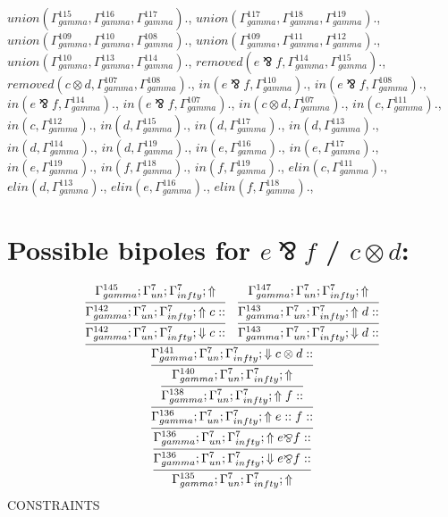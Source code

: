 \documentclass[a4paper, 11pt]{article}
\begin{document}
$union(\Gamma_{gamma}^{115}, \Gamma_{gamma}^{116}, \Gamma_{gamma}^{117}).$, $union(\Gamma_{gamma}^{117}, \Gamma_{gamma}^{118}, \Gamma_{gamma}^{119}).$, $union(\Gamma_{gamma}^{109}, \Gamma_{gamma}^{110}, \Gamma_{gamma}^{108}).$, $union(\Gamma_{gamma}^{109}, \Gamma_{gamma}^{111}, \Gamma_{gamma}^{112}).$, $union(\Gamma_{gamma}^{110}, \Gamma_{gamma}^{113}, \Gamma_{gamma}^{114}).$, $removed(e \bindnasrepma f, \Gamma_{gamma}^{114}, \Gamma_{gamma}^{115}).$, $removed(c \otimes d, \Gamma_{gamma}^{107}, \Gamma_{gamma}^{108}).$, $in(e \bindnasrepma f, \Gamma_{gamma}^{110}).$, $in(e \bindnasrepma f, \Gamma_{gamma}^{108}).$, $in(e \bindnasrepma f, \Gamma_{gamma}^{114}).$, $in(e \bindnasrepma f, \Gamma_{gamma}^{107}).$, $in(c \otimes d, \Gamma_{gamma}^{107}).$, $in(c, \Gamma_{gamma}^{111}).$, $in(c, \Gamma_{gamma}^{112}).$, $in(d, \Gamma_{gamma}^{115}).$, $in(d, \Gamma_{gamma}^{117}).$, $in(d, \Gamma_{gamma}^{113}).$, $in(d, \Gamma_{gamma}^{114}).$, $in(d, \Gamma_{gamma}^{119}).$, $in(e, \Gamma_{gamma}^{116}).$, $in(e, \Gamma_{gamma}^{117}).$, $in(e, \Gamma_{gamma}^{119}).$, $in(f, \Gamma_{gamma}^{118}).$, $in(f, \Gamma_{gamma}^{119}).$, $elin(c, \Gamma_{gamma}^{111}).$, $elin(d, \Gamma_{gamma}^{113}).$, $elin(e, \Gamma_{gamma}^{116}).$, $elin(f, \Gamma_{gamma}^{118}).$, 
\section{Possible bipoles for $e \bindnasrepma f$ / $c \otimes d$:} 

{\small
\[
\infer{\Gamma_{ gamma}^{135} ; \Gamma_{un}^{7} ; \Gamma_{ infty}^{7} ;  \Uparrow }
{\infer{\Gamma_{ gamma}^{136} ; \Gamma_{un}^{7} ; \Gamma_{ infty}^{7} ;  \Downarrow e \bindnasrepma f :: }
{\infer{\Gamma_{ gamma}^{136} ; \Gamma_{un}^{7} ; \Gamma_{ infty}^{7} ;  \Uparrow e \bindnasrepma f :: }
{\infer{\Gamma_{ gamma}^{136} ; \Gamma_{un}^{7} ; \Gamma_{ infty}^{7} ;  \Uparrow e :: f :: }
{\infer{\Gamma_{ gamma}^{138} ; \Gamma_{un}^{7} ; \Gamma_{ infty}^{7} ;  \Uparrow f :: }
{\infer{\Gamma_{ gamma}^{140} ; \Gamma_{un}^{7} ; \Gamma_{ infty}^{7} ;  \Uparrow }
{\infer{\Gamma_{ gamma}^{141} ; \Gamma_{un}^{7} ; \Gamma_{ infty}^{7} ;  \Downarrow c \otimes d :: }
{\infer{\Gamma_{ gamma}^{142} ; \Gamma_{un}^{7} ; \Gamma_{ infty}^{7} ;  \Downarrow c :: }
{\infer{\Gamma_{ gamma}^{142} ; \Gamma_{un}^{7} ; \Gamma_{ infty}^{7} ;  \Uparrow c :: }
{\Gamma_{ gamma}^{145} ; \Gamma_{un}^{7} ; \Gamma_{ infty}^{7} ;  \Uparrow }}
&
\infer{\Gamma_{ gamma}^{143} ; \Gamma_{un}^{7} ; \Gamma_{ infty}^{7} ;  \Downarrow d :: }
{\infer{\Gamma_{ gamma}^{143} ; \Gamma_{un}^{7} ; \Gamma_{ infty}^{7} ;  \Uparrow d :: }
{\Gamma_{ gamma}^{147} ; \Gamma_{un}^{7} ; \Gamma_{ infty}^{7} ;  \Uparrow }}}}}}}}}
\]
}
CONSTRAINTS
\end{document}
